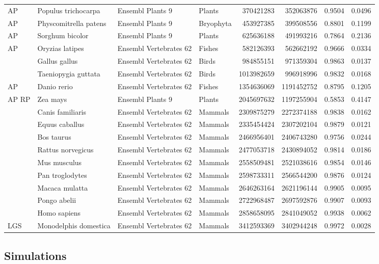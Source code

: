 \begin{table}[htbp]
{\begin{tabular}{ l l l l r r r r }
  AP & Populus trichocarpa & Ensembl Plants 9 & Plants & 370421283 & 352063876 & 0.9504 & 0.0496 \\
  AP & Physcomitrella patens & Ensembl Plants 9 & Bryophyta & 453927385 & 399508556 & 0.8801 & 0.1199 \\
  AP & Sorghum bicolor & Ensembl Plants 9 & Plants & 625636188 & 491993216 & 0.7864 & 0.2136 \\
  AP & Oryzias latipes & Ensembl Vertebrates 62 & Fishes & 582126393 & 562662192 & 0.9666 & 0.0334 \\
   & Gallus gallus & Ensembl Vertebrates 62 & Birds & 984855151 & 971359304 & 0.9863 & 0.0137 \\
   & Taeniopygia guttata & Ensembl Vertebrates 62 & Birds & 1013982659 & 996918996 & 0.9832 & 0.0168 \\
  AP & Danio rerio & Ensembl Vertebrates 62 & Fishes & 1354636069 & 1191452752 & 0.8795 & 0.1205 \\
  AP RP & Zea mays & Ensembl Plants 9 & Plants & 2045697632 & 1197255904 & 0.5853 & 0.4147 \\
   & Canis familiaris & Ensembl Vertebrates 62 & Mammals & 2309875279 & 2272374188 & 0.9838 & 0.0162 \\
   & Equus caballus & Ensembl Vertebrates 62 & Mammals & 2335454424 & 2307202104 & 0.9879 & 0.0121 \\
   & Bos taurus & Ensembl Vertebrates 62 & Mammals & 2466956401 & 2406743280 & 0.9756 & 0.0244 \\
   & Rattus norvegicus & Ensembl Vertebrates 62 & Mammals & 2477053718 & 2430894052 & 0.9814 & 0.0186 \\
   & Mus musculus & Ensembl Vertebrates 62 & Mammals & 2558509481 & 2521038616 & 0.9854 & 0.0146 \\
   & Pan troglodytes & Ensembl Vertebrates 62 & Mammals & 2598733311 & 2566544200 & 0.9876 & 0.0124 \\
   & Macaca mulatta & Ensembl Vertebrates 62 & Mammals & 2646263164 & 2621196144 & 0.9905 & 0.0095 \\
   & Pongo abelii & Ensembl Vertebrates 62 & Mammals & 2722968487 & 2697592876 & 0.9907 & 0.0093 \\
   & Homo sapiens & Ensembl Vertebrates 62 & Mammals & 2858658095 & 2841049052 & 0.9938 & 0.0062 \\
  LGS & Monodelphis domestica & Ensembl Vertebrates 62 & Mammals & 3412593369 & 3402944248 & 0.9972 & 0.0028 \\ \hline
  \end{tabular}
}
\label{table:genome}
\end{table}




\subsection{Simulations}

